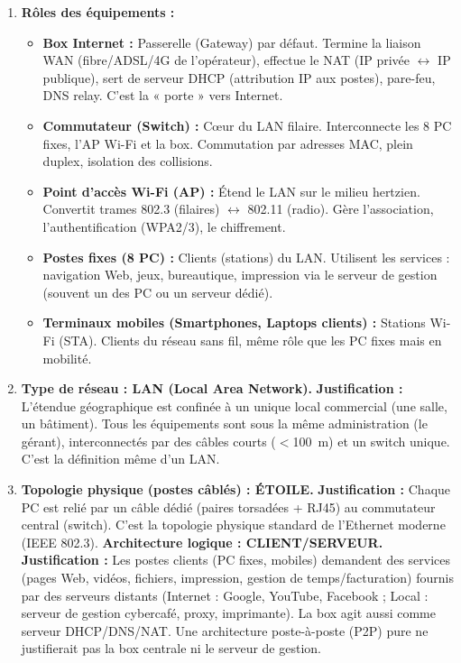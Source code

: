 \documentclass[11pt]{article}
\newcommand{\cle}[1]{{\popxbold\color{popdark}#1}}
\begin{document}
\begin{corrige}
\begin{enumerate}
  \item \textbf{Rôles des équipements :}
  \begin{itemize}
    \item \textbf{Box Internet :} Passerelle (Gateway) par défaut. Termine la liaison WAN (fibre/ADSL/4G de l'opérateur), effectue le NAT (IP privée $\leftrightarrow$ IP publique), sert de serveur DHCP (attribution IP aux postes), pare-feu, DNS relay. C'est la « porte » vers Internet.
    \item \textbf{Commutateur (Switch) :} Cœur du LAN filaire. Interconnecte les 8 PC fixes, l'AP Wi-Fi et la box. Commutation par adresses MAC, plein duplex, isolation des collisions.
    \item \textbf{Point d'accès Wi-Fi (AP) :} Étend le LAN sur le milieu hertzien. Convertit trames 802.3 (filaires) $\leftrightarrow$ 802.11 (radio). Gère l'association, l'authentification (WPA2/3), le chiffrement.
    \item \textbf{Postes fixes (8 PC) :} Clients (stations) du LAN. Utilisent les services : navigation Web, jeux, bureautique, impression via le serveur de gestion (souvent un des PC ou un serveur dédié).
    \item \textbf{Terminaux mobiles (Smartphones, Laptops clients) :} Stations Wi-Fi (STA). Clients du réseau sans fil, même rôle que les PC fixes mais en mobilité.
  \end{itemize}

  \item \textbf{Type de réseau : \cle{LAN} (Local Area Network).}
  \textbf{Justification :} L'étendue géographique est confinée à un unique local commercial (une salle, un bâtiment). Tous les équipements sont sous la même administration (le gérant), interconnectés par des câbles courts ($<$\SI{100}{m}) et un switch unique. C'est la définition même d'un LAN.

  \item \textbf{Topologie physique (postes câblés) : \cle{ÉTOILE}.}
  \textbf{Justification :} Chaque PC est relié par un câble dédié (paires torsadées + RJ45) au commutateur central (switch). C'est la topologie physique standard de l'Ethernet moderne (IEEE 802.3).
  \textbf{Architecture logique : \cle{CLIENT/SERVEUR}.}
  \textbf{Justification :} Les postes clients (PC fixes, mobiles) demandent des services (pages Web, vidéos, fichiers, impression, gestion de temps/facturation) fournis par des serveurs distants (Internet : Google, YouTube, Facebook ; Local : serveur de gestion cybercafé, proxy, imprimante). La box agit aussi comme serveur DHCP/DNS/NAT. Une architecture poste-à-poste (P2P) pure ne justifierait pas la box centrale ni le serveur de gestion.


\end{enumerate}
\end{corrige}
\end{document}
